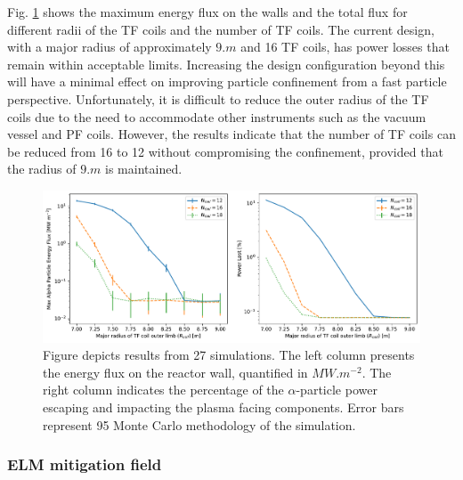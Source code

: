 \documentclass[10pt, a4paper, twoside]{article}
\begin{document}
Fig. \ref{fig:max_and_total_flux_vs_rcoil_and_ncoil} shows the maximum energy flux on the walls and the total flux for different radii of the TF coils and the number of TF coils. The current design, with a major radius of approximately $\si{9.m}$ and 16 TF coils, has power losses that remain within acceptable limits. Increasing the design configuration beyond this will have a minimal effect on improving particle confinement from a fast particle perspective. 
Unfortunately, it is difficult to reduce the outer radius of the TF coils due to the need to accommodate other instruments such as the vacuum vessel and PF coils. However, the results indicate that the number of TF coils can be reduced from 16 to 12 without compromising the confinement, provided that the radius of $9\si{.m}$ is maintained.

\begin{figure}[!htb]
    \centering
    \includegraphics[width=0.99\linewidth]{Figures/max_and_total_flux_vs_rcoil_and_ncoil.pdf}
    \caption{Figure depicts results from 27 simulations. The left column presents the energy flux on the reactor wall, quantified in $\si{MW.m^{-2}}$. The right column indicates the percentage of the $\alpha$-particle power escaping and impacting the plasma facing components. Error bars represent 95%
Monte Carlo methodology of the simulation.}
    \label{fig:max_and_total_flux_vs_rcoil_and_ncoil}
\end{figure}

\subsubsection{ELM mitigation field}
\label{sec:elm_mitigation_field}
\end{document}
